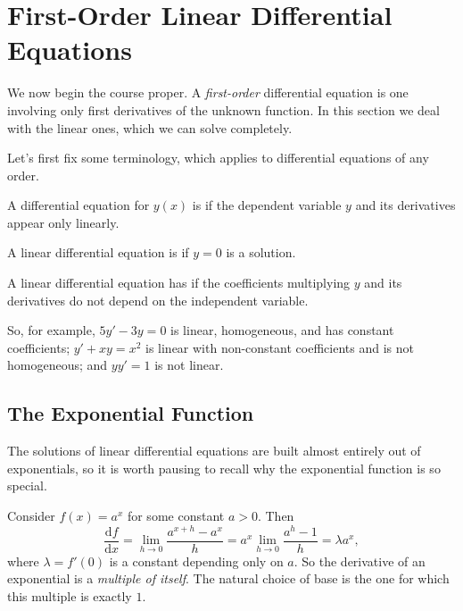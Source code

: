 \documentclass[a4paper]{scrartcl}
\begin{document}
\section{First-Order Linear Differential Equations}

We now begin the course proper. A \emph{first-order} differential equation is one involving only first derivatives of the unknown function. In this section we deal with the linear ones, which we can solve completely.

Let's first fix some terminology, which applies to differential equations of any order.

\begin{definition}[Linearity]
	A differential equation for $y(x)$ is  if the dependent variable $y$ and its derivatives appear only linearly.
\end{definition}

\begin{definition}
	A linear differential equation is  if $y = 0$ is a solution.
\end{definition}

\begin{definition}
	A linear differential equation has  if the coefficients multiplying $y$ and its derivatives do not depend on the independent variable.
\end{definition}

So, for example, $5y' - 3y = 0$ is linear, homogeneous, and has constant coefficients; $y' + xy = x^2$ is linear with non-constant coefficients and is not homogeneous; and $y y' = 1$ is not linear.

\subsection{The Exponential Function}

The solutions of linear differential equations are built almost entirely out of exponentials, so it is worth pausing to recall why the exponential function is so special.

Consider $f(x) = a^x$ for some constant $a > 0$. Then
$$
\frac{\mathrm{d}f}{\mathrm{d}x} = \lim_{h \to 0} \frac{a^{x + h} - a^x}{h} = a^x \lim_{h \to 0} \frac{a^h - 1}{h} = \lambda a^x,
$$
where $\lambda = f'(0)$ is a constant depending only on $a$. So the derivative of an exponential is a \emph{multiple of itself}. The natural choice of base is the one for which this multiple is exactly $1$.
\end{document}
